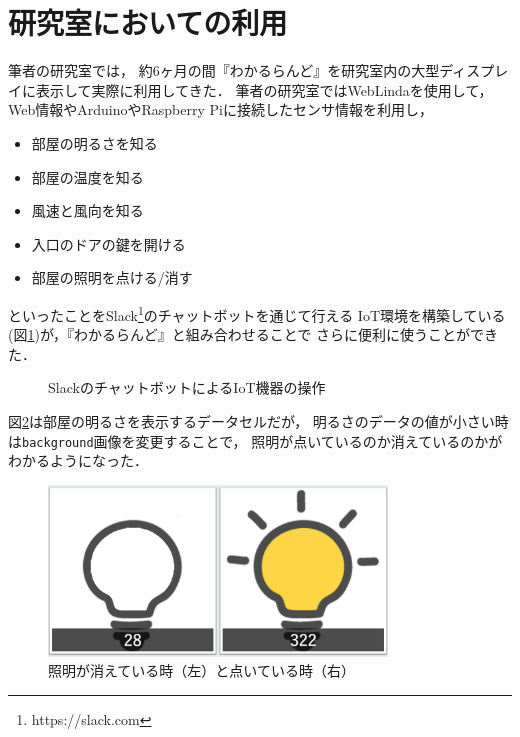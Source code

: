 \section{研究室においての利用}
筆者の研究室では，
約6ヶ月の間『わかるらんど』を研究室内の大型ディスプレイに表示して実際に利用してきた．
筆者の研究室ではWebLindaを使用して，
Web情報やArduinoやRaspberry Piに接続したセンサ情報を利用し，
\begin{itemize}
\item 部屋の明るさを知る
\item 部屋の温度を知る
\item 風速と風向を知る
\item 入口のドアの鍵を開ける
\item 部屋の照明を点ける/消す
\end{itemize}
といったことをSlack\footnote{https://slack.com}のチャットボットを通じて行える
IoT環境を構築している(図\ref{slack})が，『わかるらんど』と組み合わせることで
さらに便利に使うことができた．

\begin{figure}[h]
\centering
{}
\caption{SlackのチャットボットによるIoT機器の操作}
\label{slack}
\end{figure}

図\ref{light}は部屋の明るさを表示するデータセルだが，
明るさのデータの値が小さい時は\texttt{background}画像を変更することで，
照明が点いているのか消えているのかがわかるようになった．

\begin{figure}[h]
\centering
\includegraphics[width=9cm]{images/light.png}
\caption{照明が消えている時（左）と点いている時（右）}
\label{light}
\end{figure}

